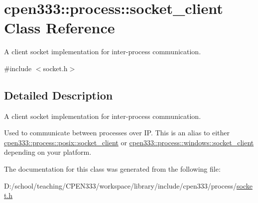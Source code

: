 \hypertarget{classcpen333_1_1process_1_1socket__client}{}\section{cpen333\+:\+:process\+:\+:socket\+\_\+client Class Reference}
\label{classcpen333_1_1process_1_1socket__client}


A client socket implementation for inter-\/process communication.  




{\ttfamily \#include $<$socket.\+h$>$}



\subsection{Detailed Description}
A client socket implementation for inter-\/process communication. 

Used to communicate between processes over IP. This is an alias to either \hyperlink{classcpen333_1_1process_1_1posix_1_1socket__client}{cpen333\+::process\+::posix\+::socket\+\_\+client} or \hyperlink{classcpen333_1_1process_1_1windows_1_1socket__client}{cpen333\+::process\+::windows\+::socket\+\_\+client} depending on your platform. 

The documentation for this class was generated from the following file\+:\begin{DoxyCompactItemize}
\item 
D\+:/school/teaching/\+C\+P\+E\+N333/workspace/library/include/cpen333/process/\hyperlink{socket_8h}{socket.\+h}\end{DoxyCompactItemize}
